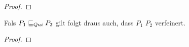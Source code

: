 \begin{proof}
\end{proof}

\begin{Satz}
  \label{RuheTestVerfSatz}
  Fals $P_1 \sqsubseteq  _{Qui} P_2$ gilt folgt draus auch, dass $P_1$ $P_2$ verfeinert.
\end{Satz}
\begin{proof}
\end{proof}


